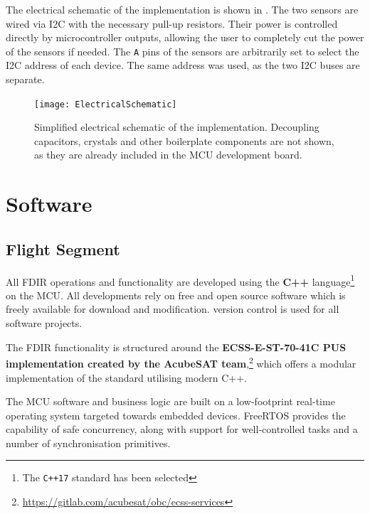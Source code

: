 \documentclass[a4paper,nobib]{tufte-book}
\begin{document}
The electrical schematic of the implementation is shown in .
The two sensors are wired via \ac{I2C} with the necessary pull-up resistors. Their power is controlled directly by microcontroller outputs, allowing the user to completely cut the power of the sensors if needed. The \texttt{A} pins of the sensors are arbitrarily set to select the \ac{I2C} address of each device. The same address was used, as the two \ac{I2C} buses are separate.

\begin{figure}[h]
	\texttt{[image: ElectricalSchematic]}
	\caption[Simplified electrical schematic of the implementation]{Simplified electrical schematic of the implementation. Decoupling capacitors, crystals and other boilerplate components are not shown, as they are already included in the \ac{MCU} development board.}
	\label{fig:schematic}
\end{figure}

\FloatBarrier
\section{Software}

\subsection{Flight Segment}

All \ac{FDIR} operations and functionality are developed using the \textbf{C++} language\footnote{The \texttt{C++17} standard has been selected} on the \ac{MCU}. All developments rely on free and open source software which is freely available for download and modification.  version control is used for all software projects.

The \ac{FDIR} functionality is structured around the \textbf{ECSS-E-ST-70-41C \ac{PUS} implementation created by the AcubeSAT team},\footnote{\url{https://gitlab.com/acubesat/obc/ecss-services}} which offers a modular implementation of the standard utilising modern C++.

The \ac{MCU} software and business logic are built on  a low-footprint real-time operating system targeted towards embedded devices. FreeRTOS provides the capability of safe concurrency, along with support for well-controlled tasks and a number of synchronisation primitives.
\end{document}
